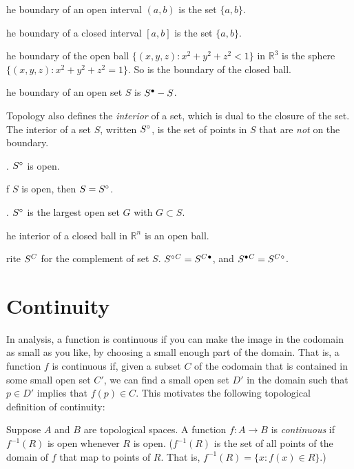 \documentclass{article}
\def\R{{\mathbb R}}
\def\Rn{{\R^n}}
\newcounter{exercisecounter}\setcounter{exercisecounter}{1}
\def\Exercise.#1\par{{\item\small \makebox{\bf Exercise \number\theexercisecounter.\hspace{0.5em}}\unskip\ignorespaces#1\addtocounter{exercisecounter}{1}}}
\def\comp#1{\smash{#1}^C\vphantom{#1}}
\def\inter#1{\smash{#1}^\circ\vphantom{#1}}
\def\clos#1{\smash{#1}^\bullet\vphantom{#1}}
\def\closcomp#1{\clos{\comp{#1}}}
\def\compclos#1{\comp{\clos{#1}}}
\def\intercomp#1{\inter{\comp{#1}}}
\def\compinter#1{\comp{\inter{#1}}}
\begin{document}
\begin{itemize}
\Exercise. The boundary of an open interval $(a, b)$ is the set $\{a, b\}$.

\Exercise. The boundary of a closed interval $[a, b]$ is the set $\{a, b\}$.

\Exercise. The boundary of the open ball $\{(x,y,z) : x^2 + y^2 + z^2 <
1\}$ in $\R^3$ is the sphere  $\{(x,y,z) : x^2 + y^2 + z^2 = 1\}$.   So
is the boundary of the closed ball. 

\Exercise. The boundary of an open set $S$ is $\clos S - S$.

\end{itemize}

Topology also defines the {\em interior\/} of a set, which is dual to
the closure of the set.  The interior of a set $S$, written $\inter
S$, is the set of points in $S$ that are {\em not\/} on the boundary.

\begin{itemize}
\Exercise. $\inter S$ is open.

\Exercise. If $S$ is open, then $S = \inter S$.

\Exercise. $\inter S$ is the largest open set $G$ with $G\subset S$.

\Exercise. The interior of a closed ball in $\Rn$ is an open ball.  

\Exercise. Write $\comp S$ for the complement of set $S$.  $\compinter S = \closcomp S$, and
$\compclos S = \intercomp S$.

\end{itemize}

\section*{Continuity}

In analysis, a function is continuous if you can make the image in the
codomain as small as you like, by choosing a small enough part of the
domain.  That is, a function $f$ is continuous if, given a subset $C$
of the codomain that is contained in some small open set $C'$, we can
find a small open set $D'$ in the domain such that $p\in D'$ implies
that $f(p)\in C$.  This motivates the following topological definition
of continuity:

Suppose $A$ and $B$ are topological spaces.  A function $f : A\to B$
is {\em continuous\/} if $f^{-1}(R)$ is open whenever $R$ is open.
($f^{-1}(R)$ is the set of all points of the domain of $f$ that map to
points of $R$.  That is, $f^{-1}(R) = \{ x : f(x)\in R \}$.)
\end{document}
